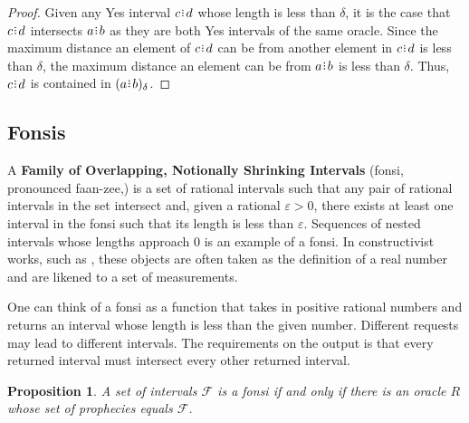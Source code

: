 \documentclass[12pt]{article}
\newtheorem{proposition}{Proposition}[section]
\begin{document}
\begin{proof}
    Given any Yes interval $c\rint d$ whose length is less than $\delta$, it is the case that $c\rint d$ intersects $a\rint b$ as they are both Yes intervals of the same oracle. Since the maximum distance an element of $c\rint d$ can be from another element in $c\rint d$ is less than $\delta$, the maximum distance an element can be from $a\rint b$ is less than $\delta$. Thus, $c\rint d$ is contained in $\halo{a\rint b}$.
\end{proof}


\subsection{Fonsis}\label{os-fonsis}

 A \textbf{Family of Overlapping, Notionally Shrinking Intervals} (fonsi, pronounced faan-zee,) is a set of rational intervals such that any pair of rational intervals in the set intersect and, given a rational $\varepsilon >0$, there exists at least one interval in the fonsi such that its length is less than $\varepsilon$. Sequences of nested intervals whose lengths approach 0 is an example of a fonsi. In constructivist works, such as \cite{bridger}, these objects are often taken as the definition of a real number and are likened to a set of measurements. 

One can think of a fonsi as a function that takes in positive rational numbers and returns an interval whose length is less than the given number. Different requests may lead to different intervals. The requirements on the output is that every returned interval must intersect every other returned interval. 

\begin{proposition}
    A set of intervals $\mathcal{F}$ is a fonsi if and only if there is an oracle $R$ whose set of prophecies equals $\mathcal{F}$.
\end{proposition}
\end{document}
